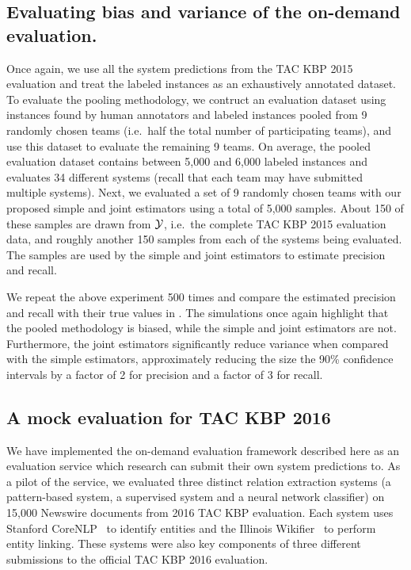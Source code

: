 \subsection{Evaluating bias and variance of the on-demand evaluation.}
Once again, we use all the system predictions from the TAC KBP 2015 evaluation and treat the labeled instances as an exhaustively annotated dataset.
To evaluate the pooling methodology, we contruct an evaluation dataset using
instances found by human annotators and labeled instances pooled from 9
randomly chosen teams (i.e.\ half the total number of participating teams), and
use this dataset to evaluate the remaining 9 teams.
On average, the pooled evaluation dataset contains between 5,000 and 6,000 labeled instances and evaluates 34 different systems (recall that each team may have submitted multiple systems).
Next, we evaluated a set of 9 randomly chosen teams with our proposed simple and joint estimators using a total of 5,000 samples.
About 150 of these samples are drawn from $\mathcal{Y}$, i.e.\ the complete TAC KBP 2015 evaluation data, and roughly another 150 samples from each of the systems being evaluated.
The samples are used by the simple and joint estimators to estimate precision and recall.

We repeat the above experiment 500 times and compare the estimated precision and recall with their true values in .
The simulations once again highlight that the pooled methodology is biased, while the simple and joint estimators are not.
Furthermore, the joint estimators significantly reduce variance when compared with the simple estimators,
approximately reducing the size the 90\% confidence intervals by a factor of 2 for precision and a factor of 3 for recall.

\subsection{A mock evaluation for TAC KBP 2016}
We have implemented the on-demand evaluation framework described here as an evaluation service which research can submit their own system predictions to.
As a pilot of the service, we evaluated three distinct relation extraction systems (a pattern-based system, a supervised system and a neural network classifier) on 15,000 Newswire documents from 2016 TAC KBP evaluation.
Each system uses Stanford CoreNLP~\citep{manning2014stanford} to identify entities and the Illinois Wikifier~\citep{ratinov2011local} to perform entity linking. 
These systems were also key components of three different submissions to the official TAC KBP 2016 evaluation.

